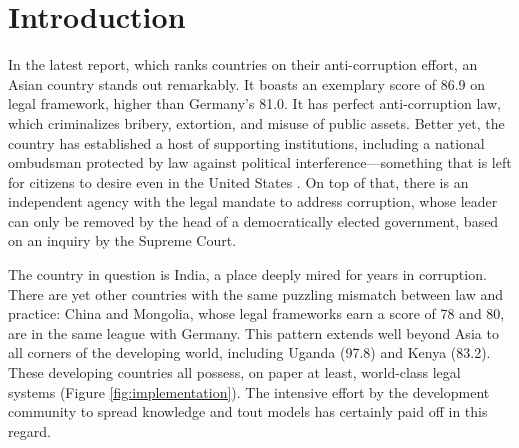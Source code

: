 \documentclass[12pt]{article}
\begin{document}
\section{Introduction} \label{sec:intro}

In the latest \citet{Integrity2012a} report, which ranks countries on their anti-corruption effort, an Asian country stands out remarkably. It boasts an exemplary score of 86.9 on legal framework, higher than Germany's 81.0. It has perfect anti-corruption law, which criminalizes bribery, extortion, and misuse of public assets. Better yet, the country has established a host of supporting institutions, including a national ombudsman protected by law against political interference---something that is left for citizens to desire even in the United States \citep{MinistryofLawandJustice2003}. On top of that, there is an independent agency with the legal mandate to address corruption, whose leader can only be removed by the head of a democratically elected government, based on an inquiry by the Supreme Court.

The country in question is India, a place deeply mired for years in corruption. There are yet other countries with the same puzzling mismatch between law and practice: China and Mongolia, whose legal frameworks earn a score of 78 and 80, are in the same league with Germany. This pattern extends well beyond Asia to all corners of the developing world, including Uganda (97.8) and Kenya (83.2). These developing countries all possess, on paper at least, world-class legal systems (Figure \ref{fig:implementation}). The intensive effort by the development community to spread knowledge and tout models has certainly paid off in this regard.
\end{document}
